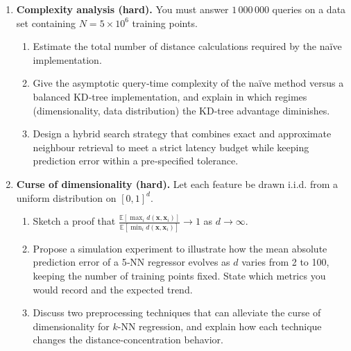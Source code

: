 \documentclass[12pt, a4paper]{article}
\begin{document}
\begin{enumerate}
    \item \textbf{Complexity analysis (hard).}  
    You must answer \(1\,000\,000\) queries on a data set containing \(N=5\times10^{6}\) training points.  
    \begin{enumerate}
        \item Estimate the total number of distance calculations required by the naïve implementation.  
        \item Give the asymptotic query‑time complexity of the naïve method versus a balanced KD‑tree implementation, and explain in which regimes (dimensionality, data distribution) the KD‑tree advantage diminishes.  
        \item Design a hybrid search strategy that combines exact and approximate neighbour retrieval to meet a strict latency budget while keeping prediction error within a pre‑specified tolerance.
    \end{enumerate}

    \item \textbf{Curse of dimensionality (hard).}  
    Let each feature be drawn i.i.d. from a uniform distribution on \([0,1]^{d}\).  
    \begin{enumerate}
        \item Sketch a proof that \(\displaystyle\frac{\mathbb{E}[\max_{i} d(\mathbf{x},\mathbf{x}_{i})]}{\mathbb{E}[\min_{i} d(\mathbf{x},\mathbf{x}_{i})]}\rightarrow 1\) as \(d\to\infty\).  
        \item Propose a simulation experiment to illustrate how the mean absolute prediction error of a 5‑NN regressor evolves as \(d\) varies from 2 to 100, keeping the number of training points fixed.  State which metrics you would record and the expected trend.  
        \item Discuss two preprocessing techniques that can alleviate the curse of dimensionality for \(k\)-NN regression, and explain how each technique changes the distance‑concentration behavior.
    \end{enumerate}


\end{enumerate}
\end{document}
